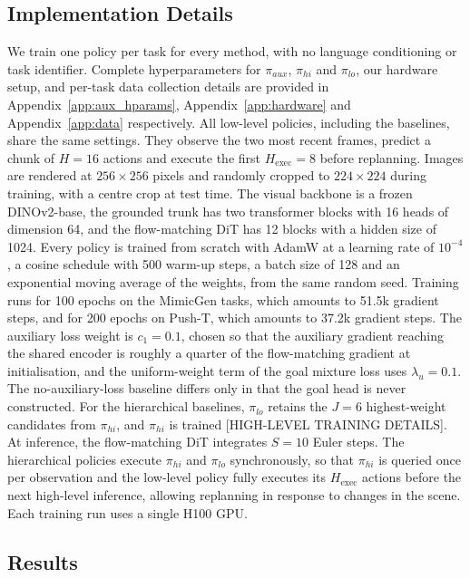 \documentclass[letterpaper, 10 pt, conference]{ieeeconf}  %
\begin{document}
\subsection{Implementation Details}

We train one policy per task for every method, with no language conditioning or task identifier. Complete hyperparameters for $\pi_{aux}$, $\pi_{hi}$ and $\pi_{lo}$, our hardware setup, and per-task data collection details are provided in Appendix~\ref{app:aux_hparams}, Appendix~\ref{app:hardware} and Appendix~\ref{app:data} respectively. All low-level policies, including the baselines, share the same settings. They observe the two most recent frames, predict a chunk of $H{=}16$ actions and execute the first $H_{\text{exec}}{=}8$ before replanning. Images are rendered at $256\times256$ pixels and randomly cropped to $224\times224$ during training, with a centre crop at test time. The visual backbone is a frozen DINOv2-base, the grounded trunk has two transformer blocks with 16 heads of dimension 64, and the flow-matching DiT has 12 blocks with a hidden size of 1024. Every policy is trained from scratch with AdamW at a learning rate of $10^{-4}$, a cosine schedule with 500 warm-up steps, a batch size of 128 and an exponential moving average of the weights, from the same random seed. Training runs for 100 epochs on the MimicGen tasks, which amounts to 51.5k gradient steps, and for 200 epochs on Push-T, which amounts to 37.2k gradient steps. The auxiliary loss weight is $c_1{=}0.1$, chosen so that the auxiliary gradient reaching the shared encoder is roughly a quarter of the flow-matching gradient at initialisation, and the uniform-weight term of the goal mixture loss uses $\lambda_u{=}0.1$. The no-auxiliary-loss baseline differs only in that the goal head is never constructed. For the hierarchical baselines, $\pi_{lo}$ retains the $J{=}6$ highest-weight candidates from $\pi_{hi}$, and $\pi_{hi}$ is trained [HIGH-LEVEL TRAINING DETAILS]. At inference, the flow-matching DiT integrates $S{=}10$ Euler steps. The hierarchical policies execute $\pi_{hi}$ and $\pi_{lo}$ synchronously, so that $\pi_{hi}$ is queried once per observation and the low-level policy fully executes its $H_{\text{exec}}$ actions before the next high-level inference, allowing replanning in response to changes in the scene. Each training run uses a single H100 GPU.

\subsection{Results}
\end{document}
